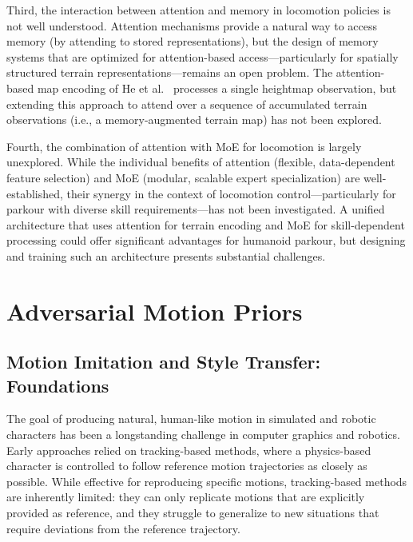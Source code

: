 Third, the interaction between attention and memory in locomotion policies is not well understood. Attention mechanisms provide a natural way to access memory (by attending to stored representations), but the design of memory systems that are optimized for attention-based access---particularly for spatially structured terrain representations---remains an open problem. The attention-based map encoding of He et al.~\cite{he2024attentionmap} processes a single heightmap observation, but extending this approach to attend over a sequence of accumulated terrain observations (i.e., a memory-augmented terrain map) has not been explored.

Fourth, the combination of attention with MoE for locomotion is largely unexplored. While the individual benefits of attention (flexible, data-dependent feature selection) and MoE (modular, scalable expert specialization) are well-established, their synergy in the context of locomotion control---particularly for parkour with diverse skill requirements---has not been investigated. A unified architecture that uses attention for terrain encoding and MoE for skill-dependent processing could offer significant advantages for humanoid parkour, but designing and training such an architecture presents substantial challenges.

\section{Adversarial Motion Priors}
\label{sec:rw_amp}

\subsection{Motion Imitation and Style Transfer: Foundations}

The goal of producing natural, human-like motion in simulated and robotic characters has been a longstanding challenge in computer graphics and robotics. Early approaches relied on tracking-based methods, where a physics-based character is controlled to follow reference motion trajectories as closely as possible. While effective for reproducing specific motions, tracking-based methods are inherently limited: they can only replicate motions that are explicitly provided as reference, and they struggle to generalize to new situations that require deviations from the reference trajectory.

